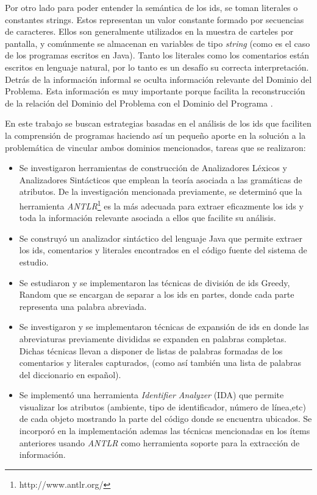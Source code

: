 \documentclass[12pt]{report}
\begin{document}
Por otro lado para poder entender la semántica de los ids, se toman literales o constantes strings.
Estos representan un valor constante formado por secuencias de caracteres. 
Ellos son generalmente utilizados en la muestra de carteles por pantalla, y 
comúnmente se almacenan en variables de tipo \textit{string} (como es el caso de los programas escritos en Java).
Tanto los literales como los comentarios están escritos en lenguaje natural, por lo tanto es un desafío su correcta interpretación.
Detrás de la información informal se oculta información relevante del Dominio del Problema.
Esta información es muy importante porque facilita  la reconstrucción de la relación del Dominio del Problema con el Dominio del Programa \cite{DWE04}.

En este trabajo se buscan estrategias basadas en el análisis de los ids que faciliten la comprensión de programas haciendo así un pequeño aporte en la solución a la problemática de vincular ambos dominios mencionados, tareas que se realizaron: 

\begin{itemize}

\item Se investigaron herramientas de construcción de Analizadores Léxicos y Analizadores Sintácticos que emplean la teoría asociada a las gramáticas de atributos. 
De la investigación mencionada previamente,  
se determinó que la herramienta \textit{ANTLR}\footnote[1]{http://www.antlr.org/} es la más adecuada para extraer eficazmente los ids y toda la información relevante asociada a ellos que facilite su análisis.

\item Se construyó un analizador sintáctico del lenguaje Java que permite extraer los ids, comentarios y literales encontrados en el código fuente del sistema de estudio.

\item  Se estudiaron y se implementaron las técnicas de división de ids Greedy, Random \cite{HDD06,FBL06} que se encargan de separar a los ids en partes, donde cada parte representa una palabra abreviada.

\item Se investigaron y se implementaron técnicas de expansión de ids en donde las abreviaturas previamente divididas se expanden en palabras completas.  
Dichas técnicas llevan a disponer de listas de palabras formadas de los comentarios y literales capturados, (como así también una lista de palabras del diccionario en español).

\item Se implementó una herramienta \textit{Identifier Analyzer} (IDA) que permite visualizar los atributos (ambiente, tipo de identificador, número de línea,etc) de cada objeto mostrando la parte del código donde se encuentra ubicados. Se incorporó en la implementación ademas las técnicas mencionadas en los ítems anteriores usando \textit{ANTLR} como herramienta soporte para la extracción de información.

\end{itemize}
\end{document}
